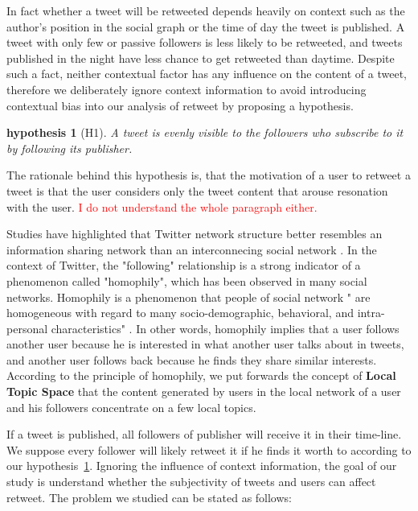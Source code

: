 \documentclass{acm_proc_article-sp}
\newtheorem{hypothesis}{hypothesis}
\newcommand{\mo}[1]{\textcolor{red}{#1}}
\begin{document}
In fact whether a tweet will be retweeted depends heavily on context such as the author's position in the social graph or the time of day the tweet is published. 
A tweet with only few or passive followers is less likely to be retweeted, and tweets published in the night have less chance to get retweeted than daytime. 
Despite such a fact, neither contextual factor has any influence on the content of a tweet, therefore we deliberately ignore context information to avoid introducing contextual bias into our analysis of retweet by proposing a hypothesis. 
\begin{hypothesis}[H1]
\label{hypothesis1}
A tweet is evenly visible to the followers who subscribe to it by following its publisher.
\end{hypothesis}
The rationale behind this hypothesis is, that the motivation of a user to retweet a tweet is that the user considers only the tweet content that arouse resonation with the user. \mo{I do not understand the whole paragraph either.} 

Studies have highlighted that Twitter network structure better resembles an information sharing network than an interconnecing social network \cite{Boyd2010,Kwak:2010TSN}. 
In the context of Twitter, the "following" relationship is a strong indicator of a phenomenon called "homophily", which has been observed in many social networks.
Homophily is a phenomenon that people of social network " are homogeneous with regard to many socio-demographic, behavioral, and intra-personal characteristics" \cite{mcpherson2001birds}.
In other words, homophily implies that a user follows another user because he is interested in what another user talks about in tweets, and another user follows back because he finds they share similar interests. 
According to the principle of homophily, we put forwards the concept of \textbf{Local Topic Space} that the content generated by users in the local network of a user and his followers concentrate on a few local topics.

If a tweet is published, all followers of publisher will receive it in their time-line. We suppose every follower will likely retweet it if he finds it worth to according to our hypothesis~\ref{hypothesis1}.
Ignoring the influence of context information, the goal of our study is understand whether the subjectivity of tweets and users can affect retweet.
The problem we studied can be stated as follows:
\end{document}
